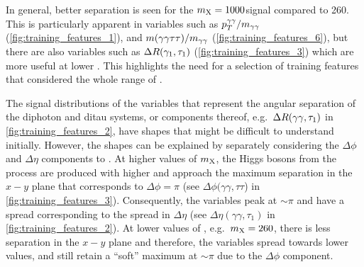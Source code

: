In general, better separation is seen for the $m_{\mathrm{X}} = 1000$\GeV signal compared to 260\GeV. This is particularly apparent in variables such as $p_T^{\gamma\gamma}/m_{\gamma\gamma}$ (\cref{fig:training_features_1}), and $m(\gamma\gamma\tau\tau) / m_{\gamma\gamma}$ (\cref{fig:training_features_6}), but there are also variables such as $\Delta R(\gamma_1, \tau_1)$ (\cref{fig:training_features_3}) which are more useful at lower \mX. This highlights the need for a selection of training features that considered the whole range of \mX.

The signal distributions of the \dR variables that represent the angular separation of the diphoton and ditau systems, or components thereof, e.g.\ $\Delta R(\gamma\gamma, \tau_1)$ in \cref{fig:training_features_2}, have shapes that might be difficult to understand initially. However, the shapes can be explained by separately considering the $\Delta\phi$ and $\Delta\eta$ components to \dR. At higher values of $m_{\mathrm{X}}$, the Higgs bosons from the \XHH process are produced with higher \pt and approach the maximum separation in the $x-y$ plane that corresponds to $\Delta\phi=\pi$ (see $\Delta\phi(\gamma\gamma,\tau\tau$) in \cref{fig:training_features_3}). Consequently, the \dR variables peak at $\sim\pi$ and have a spread corresponding to the spread in $\Delta\eta$ (see $\Delta\eta(\gamma\gamma,\tau_1)$ in \cref{fig:training_features_2}). At lower values of \mX, e.g.\ $m_{\mathrm{X}}=260$\GeV, there is less separation in the $x-y$ plane and therefore, the \dR variables spread towards lower values, and still retain a ``soft'' maximum at $\sim\pi$ due to the $\Delta\phi$ component.

